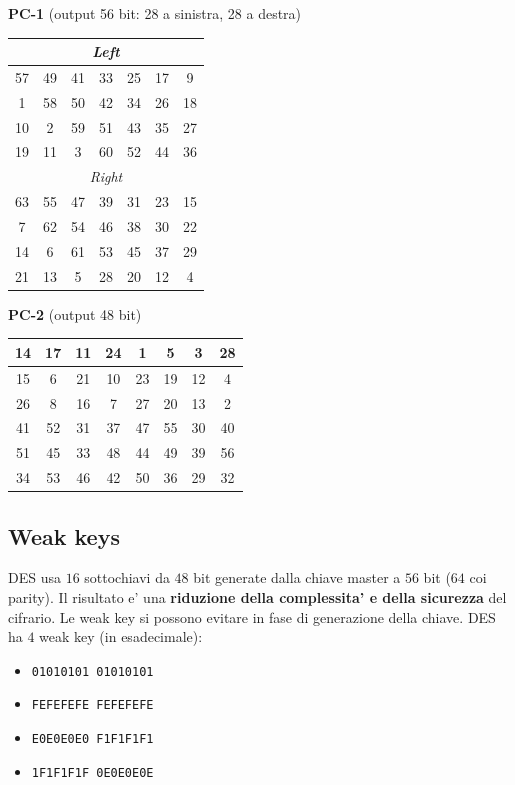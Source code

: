 \begin{center}
  \footnotesize
  \textbf{PC-1} (output 56 bit: 28 a sinistra, 28 a destra)\\[2pt]
  \begin{tabular}{|c|c|c|c|c|c|c|}
    \hline
    \multicolumn{7}{|c|}{\textit{Left}} \\ \hline
    57 & 49 & 41 & 33 & 25 & 17 & 9 \\ \hline
    1 & 58 & 50 & 42 & 34 & 26 & 18 \\ \hline
    10 & 2 & 59 & 51 & 43 & 35 & 27 \\ \hline
    19 & 11 & 3 & 60 & 52 & 44 & 36 \\ \hline
    \multicolumn{7}{|c|}{\textit{Right}} \\ \hline
    63 & 55 & 47 & 39 & 31 & 23 & 15 \\ \hline
    7 & 62 & 54 & 46 & 38 & 30 & 22 \\ \hline
    14 & 6 & 61 & 53 & 45 & 37 & 29 \\ \hline
    21 & 13 & 5 & 28 & 20 & 12 & 4 \\ \hline
  \end{tabular}
  \qquad
  \textbf{PC-2} (output 48 bit)\\[2pt]
  \begin{tabular}{|c|c|c|c|c|c|c|c|}
    \hline
    14 & 17 & 11 & 24 & 1 & 5 & 3 & 28 \\ \hline
    15 & 6 & 21 & 10 & 23 & 19 & 12 & 4 \\ \hline
    26 & 8 & 16 & 7 & 27 & 20 & 13 & 2 \\ \hline
    41 & 52 & 31 & 37 & 47 & 55 & 30 & 40 \\ \hline
    51 & 45 & 33 & 48 & 44 & 49 & 39 & 56 \\ \hline
    34 & 53 & 46 & 42 & 50 & 36 & 29 & 32 \\ \hline
  \end{tabular}
\end{center}

\subsection{Weak keys}
DES usa $ 16 $ sottochiavi da $ 48 $ bit generate dalla chiave master a $ 56 $ bit ($ 64 $ coi parity).
Il risultato e' una \textbf{riduzione della complessita' e della sicurezza} del cifrario. Le weak key si possono evitare in fase di generazione della chiave. DES ha $ 4 $ weak key (in esadecimale):
\begin{itemize}
  \item \texttt{01010101 01010101}
  \item \texttt{FEFEFEFE FEFEFEFE}
  \item \texttt{E0E0E0E0 F1F1F1F1}
  \item \texttt{1F1F1F1F 0E0E0E0E}
\end{itemize}

